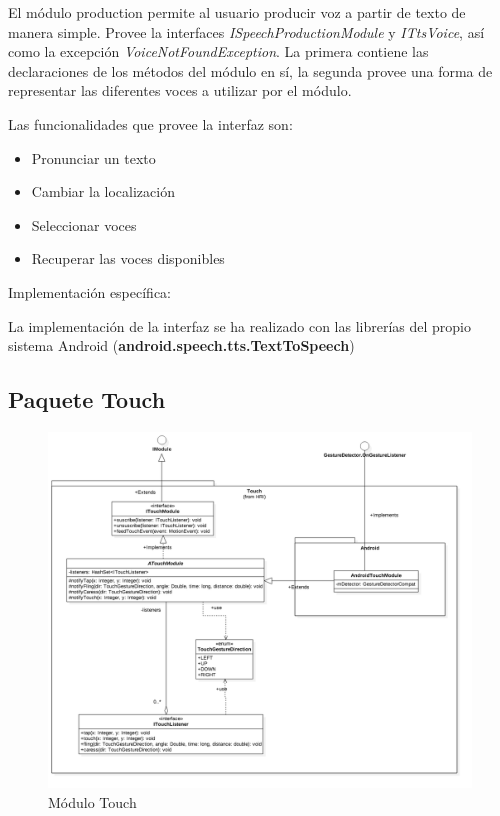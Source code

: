 El módulo production permite al usuario producir voz a partir de texto de manera simple.
Provee la interfaces \textit{ISpeechProductionModule} y \textit{ITtsVoice}, así como la excepción \textit{VoiceNotFoundException}.
La primera contiene las declaraciones de los métodos del módulo en sí, la segunda provee una forma de representar las diferentes voces a utilizar por el módulo.

Las funcionalidades que provee la interfaz son:

\begin{itemize}
	\item Pronunciar un texto
	\item Cambiar la localización 
	\item Seleccionar voces
	\item Recuperar las voces disponibles
\end{itemize}

 


Implementación específica:

La implementación de la interfaz se ha realizado con las librerías del propio sistema Android (\textbf{android.speech.tts.TextToSpeech})

\newpage
\subsection{Paquete Touch}


\begin{figure}
	\centering
	\includegraphics[width=1\linewidth]{imagenes/diagramas/TouchModule.png}
	\caption{Módulo Touch}
	\label{fig:touch-module}
\end{figure}



